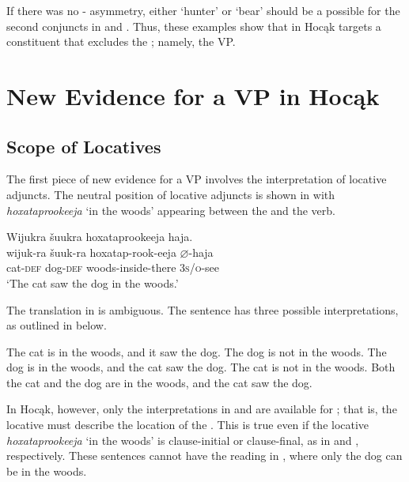\documentclass[output=paper]{LSP/langsci}
\begin{document}
 
If there was no - asymmetry, either `hunter' or `bear' should be a possible  for the second conjuncts in  and . Thus, these examples show that  in Hocąk targets a constituent that excludes the ; namely, the VP.
 

\section{New Evidence for a VP in Hocąk}\label{sec:jrs:4}

\subsection{Scope of Locatives}

The first piece of new evidence for a VP involves the interpretation of locative adjuncts. The neutral position of locative adjuncts is shown in  with \textit{hoxataprookeeja} `in the woods' appearing between the  and the verb.

\begin{exe}
\ex\label{ex:jrs:37} 
\glll Wijukra	\v{s}uukra		hoxataprookeeja		haja.\\
wijuk-ra	\v{s}uuk-ra		hoxatap-rook-eeja		$\varnothing$-haja \\
cat-\textsc{def}		dog-\textsc{def} 	woods-inside-there	\textsc{3s/o}-see \\
\trans `The cat saw the dog in the woods.' 
\end{exe}

The translation in  is ambiguous. The  sentence has three possible interpretations, as outlined in  below.

\begin{exe}
\ex\label{ex:jrs:38} 
\begin{xlist}
\ex \label{ex:jrs:38a} The cat is in the woods, and it saw the dog. The dog is not in the woods. 
\ex \label{ex:jrs:38b} The dog is in the woods, and the cat saw the dog. The cat is not in the woods.
\ex \label{ex:jrs:38c}Both the cat and the dog are in the woods, and the cat saw the dog.
\end{xlist}
\end{exe}

 
In Hocąk, however, only the interpretations in  and  are available for ; that is, the locative  must describe the location of the . This is true even if the locative \textit{hoxataprookeeja} `in the woods' is clause-initial or clause-final, as in  and  , respectively. These sentences cannot have the reading in , where only the dog can be in the woods.
 
\end{document}
